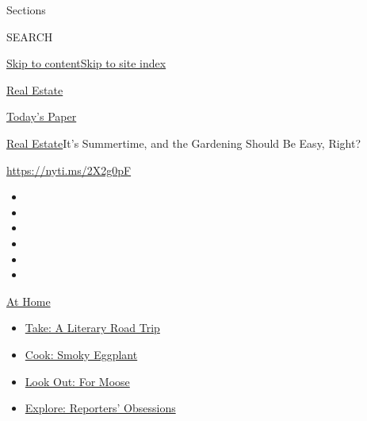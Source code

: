 Sections

SEARCH

\protect\hyperlink{site-content}{Skip to
content}\protect\hyperlink{site-index}{Skip to site index}

\href{https://www.nytimes.com/section/realestate}{Real Estate}

\href{https://myaccount.nytimes.com/auth/login?response_type=cookie\&client_id=vi}{}

\href{https://www.nytimes.com/section/todayspaper}{Today's Paper}

\href{/section/realestate}{Real Estate}\textbar{}It's Summertime, and
the Gardening Should Be Easy, Right?

\url{https://nyti.ms/2X2g0pF}

\begin{itemize}
\item
\item
\item
\item
\item
\item
\end{itemize}

\href{https://www.nytimes.com/spotlight/at-home?action=click\&pgtype=Article\&state=default\&region=TOP_BANNER\&context=at_home_menu}{At
Home}

\begin{itemize}
\tightlist
\item
  \href{https://www.nytimes.com/2020/07/28/books/time-for-a-literary-road-trip.html?action=click\&pgtype=Article\&state=default\&region=TOP_BANNER\&context=at_home_menu}{Take:
  A Literary Road Trip}
\item
  \href{https://www.nytimes.com/2020/07/29/magazine/bored-with-your-home-cooking-some-smoky-eggplant-will-fix-that.html?action=click\&pgtype=Article\&state=default\&region=TOP_BANNER\&context=at_home_menu}{Cook:
  Smoky Eggplant}
\item
  \href{https://www.nytimes.com/2020/07/27/travel/moose-michigan-isle-royale.html?action=click\&pgtype=Article\&state=default\&region=TOP_BANNER\&context=at_home_menu}{Look
  Out: For Moose}
\item
  \href{https://www.nytimes.com/interactive/2020/at-home/even-more-reporters-editors-diaries-lists-recommendations.html?action=click\&pgtype=Article\&state=default\&region=TOP_BANNER\&context=at_home_menu}{Explore:
  Reporters' Obsessions}
\end{itemize}


